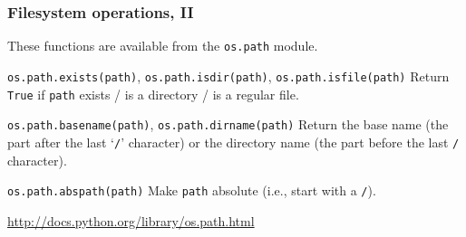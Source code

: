 \documentclass[english,serif,mathserif,xcolor=pdftex,dvipsnames,table]{beamer}
\begin{document}
\begin{frame}[fragile]
  \frametitle{Filesystem operations, II}
  These functions are available from the \texttt{os.path} module.

  \begin{describe}{\lstinline|os.path.exists(path)|, \lstinline|os.path.isdir(path)|, \lstinline|os.path.isfile(path)|}
    Return \texttt{True} if \texttt{path} exists / is a directory / is
    a regular file.
  \end{describe}

  \begin{describe}{\lstinline|os.path.basename(path)|,
      \lstinline|os.path.dirname(path)|}
    Return the base name (the part after the last `\texttt{/}'
    character) or the directory name (the part before the last
    \texttt{/} character).
  \end{describe}

  \begin{describe}{\lstinline|os.path.abspath(path)|}
    Make \texttt{path} absolute (i.e., start with a \texttt{/}).
  \end{describe}

  \begin{references}
    \url{http://docs.python.org/library/os.path.html}
  \end{references}
\end{frame}
\end{document}
